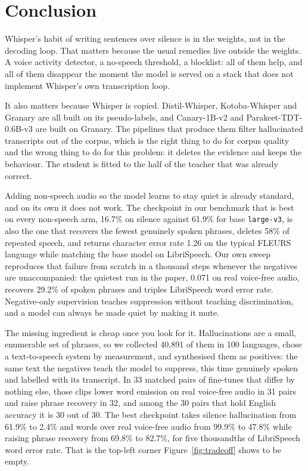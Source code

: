 \documentclass[preprint]{article}
\begin{document}
\section{Conclusion}

Whisper's habit of writing sentences over silence is in the weights, not in the decoding loop.
That matters because the usual remedies live outside the weights. A voice activity detector, a
no-speech threshold, a blocklist: all of them help, and all of them disappear the moment the
model is served on a stack that does not implement Whisper's own transcription loop.

It also matters because Whisper is copied. Distil-Whisper, Kotoba-Whisper and Granary are all
built on its pseudo-labels, and Canary-1B-v2 and Parakeet-TDT-0.6B-v3 are built on Granary. The
pipelines that produce them filter hallucinated transcripts out of the corpus, which is the
right thing to do for corpus quality and the wrong thing to do for this problem: it deletes the
evidence and keeps the behaviour. The student is fitted to the half of the teacher that was
already correct.

Adding non-speech audio so the model learns to stay quiet is already standard, and on its own
it does not work. The checkpoint in our benchmark that is best on every non-speech arm,
16.7\% on silence against 61.9\% for base \texttt{large-v3}, is also the one that recovers the
fewest genuinely spoken phrases, deletes 58\% of repeated speech, and returns character error
rate 1.26 on the typical FLEURS language while matching the base model on LibriSpeech. Our own
sweep reproduces that failure from scratch in a thousand steps whenever the negatives are
unaccompanied: the quietest run in the paper, 0.071 on real voice-free audio, recovers 29.2\%
of spoken phrases and triples LibriSpeech word error rate. Negative-only supervision teaches
suppression without teaching discrimination, and a model can always be made quiet by making it
mute.

The missing ingredient is cheap once you look for it. Hallucinations are a small, enumerable
set of phrases, so we collected 40,891 of them in 100 languages, chose a text-to-speech system
by measurement, and synthesised them as positives: the same text the negatives teach the model
to suppress, this time genuinely spoken and labelled with its transcript. In 33 matched pairs of fine-tunes that differ by nothing else, those clips lower word emission
on real voice-free audio in 31 pairs and raise phrase recovery in 32, and among the 30 pairs
that hold English accuracy it is 30 out of 30. The best checkpoint takes silence hallucination from
61.9\% to 2.4\% and words over real voice-free audio from 99.9\% to 47.8\% while raising phrase
recovery from 69.8\% to 82.7\%, for five thousandths of LibriSpeech word error rate. That is
the top-left corner Figure~\ref{fig:tradeoff} shows to be empty.
\end{document}
